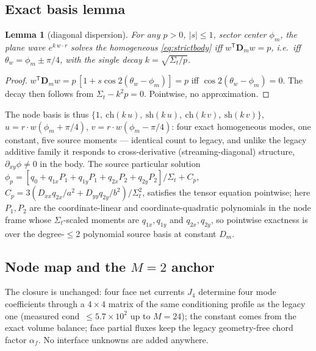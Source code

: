 \documentclass[11pt,a4paper]{article}
\newtheorem{lemma}{Lemma}
\begin{document}
\subsection{Exact basis lemma}
\begin{lemma}[diagonal dispersion]
For any $p>0$, $|s|\le 1$, sector center $\phi_m$, the plane wave
$e^{k\,w\cdot r}$ solves the homogeneous \eqref{eq:strictbody} iff
$w^{\mathsf T}\bm{D}_m w = p$, i.e.\ iff
$\theta_w = \phi_m \pm \pi/4$, with the single decay
$k=\sqrt{\Sigma_t/p}$.
\end{lemma}
\begin{proof}
$w^{\mathsf T}\bm{D}_m w = p\,[1 + s\cos 2(\theta_w-\phi_m)] = p$
iff $\cos 2(\theta_w - \phi_m) = 0$.  The decay then follows from
$\Sigma_t - k^2 p = 0$.  Pointwise, no approximation.
\end{proof}
The node basis is thus
$\{1,\ \mathrm{ch}(k\,u),\ \mathrm{sh}(k\,u),\ \mathrm{ch}(k\,v),\
\mathrm{sh}(k\,v)\}$, $u = r\!\cdot\!w(\phi_m{+}\pi/4)$,
$v = r\!\cdot\!w(\phi_m{-}\pi/4)$: four exact homogeneous modes, one
constant, five source moments --- identical count to legacy, and unlike
the legacy additive family it responds to cross-derivative
(streaming-diagonal) structure, $\partial_{xy}\phi \ne 0$ in the body.
The source particular solution
$\phi_p = [q_0 + q_{1x}P_1 + q_{1y}P_1 + q_{2x}P_2 + q_{2y}P_2]/
\Sigma_t + C_p$, $C_p = 3(D_{xx}q_{2x}/a^2 + D_{yy}q_{2y}/b^2)/
\Sigma_t^2$, satisfies the tensor equation pointwise; here
$P_1,P_2$ are the coordinate-linear and coordinate-quadratic
polynomials in the node frame whose $\Sigma_t$-scaled moments are
$q_{1x},q_{1y}$ and $q_{2x},q_{2y}$, so pointwise exactness is over
the degree-$\le$2 polynomial source basis at constant $D_m$.

\subsection{Node map and the $M=2$ anchor}
The closure is unchanged: four face net currents $J_4$ determine four
mode coefficients through a $4\times4$ matrix of the same conditioning
profile as the legacy one (measured cond\ $\le 5.7\times10^{2}$ up to
$M{=}24$); the constant comes from the exact volume balance; face
partial fluxes keep the legacy geometry-free chord factor
$\alpha_f$.  No interface unknowns are added anywhere.
\end{document}
